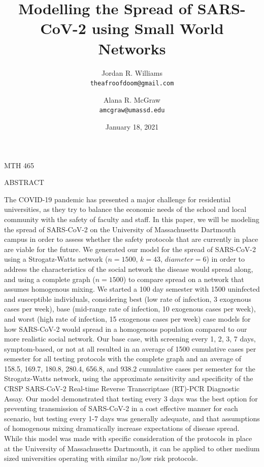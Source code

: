 \documentclass[fullpage]{extarticle}
\title{Modelling the Spread of SARS-CoV-2 using Small World Networks}
\author{
	Jordan R. Williams\\
	\texttt{theafroofdoom@gmail.com}
	\and
	Alana R. McGraw\\
	\texttt{amcgraw@umassd.edu}
}
\date{January 18, 2021}
\begin{document}
\maketitle
\begin{center}
MTH 465\\
\end{center}

\begin{large}
\begin{center}\bigbreak\bigbreak\bigbreak
ABSTRACT
\end{center}
\end{large}

\begin{large}
\begin{flushleft}
The COVID-19 pandemic has presented a major challenge for residential universities, as they try to balance the economic needs of the school and local community with the safety of faculty and staff. In this paper, we will be modeling the spread of SARS-CoV-2 on the University of Massachusetts Dartmouth campus in order to assess whether the safety protocols that are currently in place are viable for the future. We generated our model for the spread of SARS-CoV-2 using a Strogatz-Watts network ($n=1500$, $k=43$, $diameter=6$) in order to address the characteristics of the social network the disease would spread along, and using a complete graph ($n=1500$) to compare spread on a network that assumes homogenous mixing. We started a 100 day semester with 1500 uninfected and susceptible individuals, considering best (low rate of infection, 3 exogenous cases per week), base (mid-range rate of infection, 10 exogenous cases per week), and worst (high rate of infection, 15 exogenous cases per week) case models for how SARS-CoV-2 would spread in a homogenous population compared to our more realistic social network. Our base case, with screening every 1, 2, 3, 7 days, symptom-based, or not at all resulted in an average of 1500 cumulative cases per semester for all testing protocols with the complete graph and an average of 158.5, 169.7, 180.8, 280.4, 656.8, and 938.2 cumulative cases per semester for the Strogatz-Watts network, using the approximate sensitivity and specificity of the CRSP SARS-CoV-2 Real-time Reverse Transcriptase (RT)-PCR Diagnostic Assay. Our model demonstrated that testing every 3 days was the best option for preventing transmission of SARS-CoV-2 in a cost effective manner for each scenario, but testing every 1-7 days was generally adequate, and that assumptions of homogenous mixing dramatically increase expectations of disease spread. While this model was made with specific consideration of the protocols in place at the University of Massachusetts Dartmouth, it can be applied to other medium sized universities operating with similar no/low risk protocols.
\end{flushleft}
\end{large}
\end{document}
